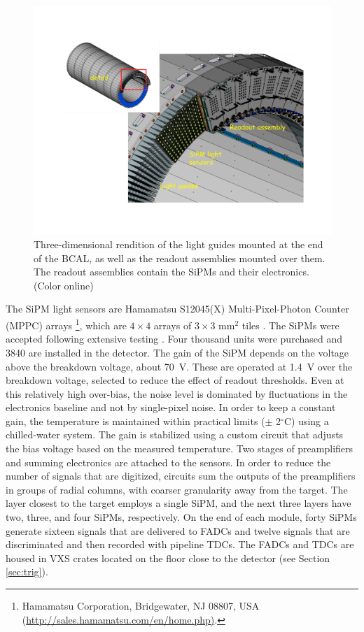 \begin{figure}[tbp]\centering
\includegraphics[scale=0.4]{figures/bcal_assemblies.pdf}
\caption{\label{fig:bcal:bcal_assemblies}
   Three-dimensional rendition of the light guides mounted at the end of the 
   BCAL, as well as the readout assemblies mounted over them. The 
   readout assemblies contain the 
   SiPMs and their electronics.  (Color online)
  }
\end{figure}


The SiPM light sensors are Hamamatsu S12045(X) Multi-Pixel-Photon Counter (MPPC) arrays \footnote{Hamamatsu Corporation, Bridgewater, NJ 08807, USA \\ (\url{http://sales.hamamatsu.com/en/home.php)}.}, 
which are $4\times4$ arrays of $3\times3$ mm$^2$ tiles \cite{hdnote2913}. The SiPMs were accepted following extensive testing \cite{Barbosa2012100,Qiang2013234,soto,Soto201489,BeattieIEEE,doi:10.1063/1.4955340}. Four thousand units were purchased and 3840 are installed in the detector. The gain of the SiPM depends on the voltage above the breakdown voltage, about 70~V. These are operated at 1.4~V over the breakdown voltage, selected to reduce the effect of readout thresholds. Even at this relatively high over-bias, the noise level is dominated by fluctuations in the electronics baseline and not by single-pixel noise. In order to keep a constant gain, the temperature is maintained within practical limits ($\pm$ 2$^\circ$C) using a chilled-water system. The gain is stabilized using a custom circuit that adjusts the bias voltage based on the measured temperature. Two stages of preamplifiers and summing electronics are attached to the sensors. In order to reduce the number of signals that are digitized, circuits sum the outputs of the preamplifiers in groups of radial columns, with coarser granularity away from the target. The layer closest to the target employs a single SiPM, and the next three layers have two, three, and four SiPMs, respectively. On the end of each module, forty SiPMs generate sixteen signals that are delivered to FADCs and twelve signals that are discriminated and then recorded with pipeline TDCs. The FADCs and TDCs are housed in VXS crates located on the floor close to the detector (see Section\,\ref{sec:trig}).

